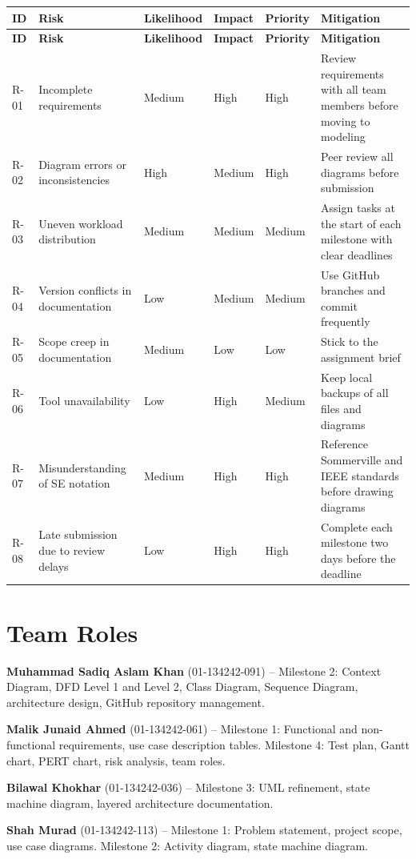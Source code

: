 \documentclass[12pt,a4paper]{article}
\begin{document}
\begin{longtable}{L{0.6cm} L{3.2cm} L{1.8cm} L{1.8cm} L{1.8cm} L{4cm}}
\toprule
\textbf{ID} & \textbf{Risk} & \textbf{Likelihood} & \textbf{Impact} & \textbf{Priority} & \textbf{Mitigation} \\
\midrule
\endfirsthead
\toprule
\textbf{ID} & \textbf{Risk} & \textbf{Likelihood} & \textbf{Impact} & \textbf{Priority} & \textbf{Mitigation} \\
\midrule
\endhead
\bottomrule
\endfoot
R-01 & Incomplete requirements & Medium & High & High & Review requirements with all team members before moving to modeling \\
R-02 & Diagram errors or inconsistencies & High & Medium & High & Peer review all diagrams before submission \\
R-03 & Uneven workload distribution & Medium & Medium & Medium & Assign tasks at the start of each milestone with clear deadlines \\
R-04 & Version conflicts in documentation & Low & Medium & Medium & Use GitHub branches and commit frequently \\
R-05 & Scope creep in documentation & Medium & Low & Low & Stick to the assignment brief \\
R-06 & Tool unavailability & Low & High & Medium & Keep local backups of all files and diagrams \\
R-07 & Misunderstanding of SE notation & Medium & High & High & Reference Sommerville and IEEE standards before drawing diagrams \\
R-08 & Late submission due to review delays & Low & High & High & Complete each milestone two days before the deadline \\
\bottomrule
\end{longtable}

\section{Team Roles}
\vspace{4pt}

\textbf{Muhammad Sadiq Aslam Khan} (01-134242-091) -- Milestone 2: Context Diagram, DFD Level 1 and Level 2, Class Diagram, Sequence Diagram, architecture design, GitHub repository management.

\textbf{Malik Junaid Ahmed} (01-134242-061) -- Milestone 1: Functional and non-functional requirements, use case description tables. Milestone 4: Test plan, Gantt chart, PERT chart, risk analysis, team roles.

\textbf{Bilawal Khokhar} (01-134242-036) -- Milestone 3: UML refinement, state machine diagram, layered architecture documentation.

\textbf{Shah Murad} (01-134242-113) -- Milestone 1: Problem statement, project scope, use case diagrams. Milestone 2: Activity diagram, state machine diagram.
\end{document}
